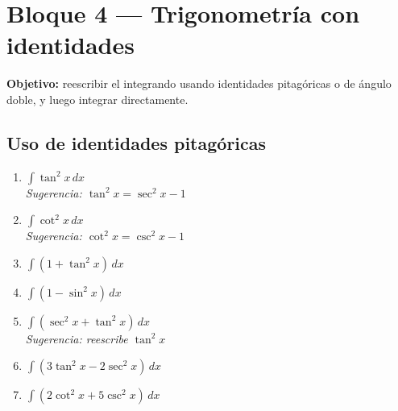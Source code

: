 \documentclass[12pt, letterpaper]{article}
\newcommand{\dx}{\,dx}
\begin{document}
\vspace{4pt}

\section{Bloque 4 — Trigonometría con identidades}

\begin{cuadroinfo}
\small\textbf{Objetivo:} reescribir el integrando usando identidades pitagóricas
o de ángulo doble, y luego integrar directamente.
\end{cuadroinfo}

\vspace{4pt}

\subsection{Uso de identidades pitagóricas}

\begin{enumerate}[label=\textbf{\arabic*.}, leftmargin=*, itemsep=14pt, start=47]

  \item \medio\quad
    $\displaystyle\int \tan^2 x \dx$\\
    \textit{Sugerencia: $\tan^2 x = \sec^2 x - 1$}

  \item \medio\quad
    $\displaystyle\int \cot^2 x \dx$\\
    \textit{Sugerencia: $\cot^2 x = \csc^2 x - 1$}

  \item \medio\quad
    $\displaystyle\int (1 + \tan^2 x)\dx$

  \item \medio\quad
    $\displaystyle\int (1 - \sin^2 x)\dx$

  \item \dificil\quad
    $\displaystyle\int (\sec^2 x + \tan^2 x)\dx$\\
    \textit{Sugerencia: reescribe $\tan^2 x$}

  \item \dificil\quad
    $\displaystyle\int (3\tan^2 x - 2\sec^2 x)\dx$

  \item \dificil\quad
    $\displaystyle\int (2\cot^2 x + 5\csc^2 x)\dx$

\end{enumerate}
\end{document}
